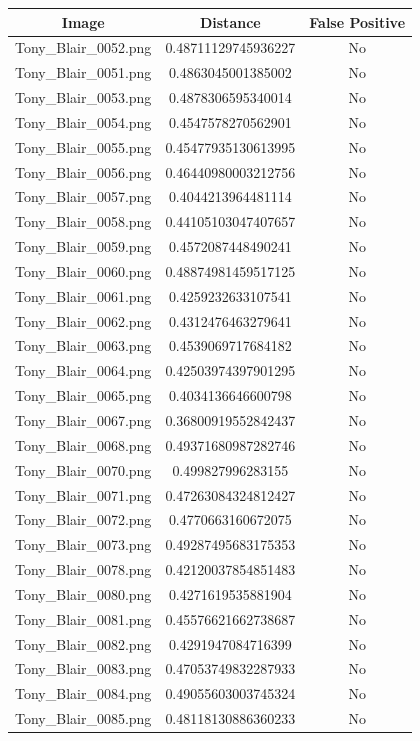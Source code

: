 \documentclass[12pt]{article}
\begin{document}
\begin{center}
\begin{tabular}{ccc}
Image & Distance & False Positive \\
\hline
Tony\_Blair\_0052.png & 0.48711129745936227 & No\\
Tony\_Blair\_0051.png & 0.4863045001385002 & No\\
Tony\_Blair\_0053.png & 0.4878306595340014 & No\\
Tony\_Blair\_0054.png & 0.4547578270562901 & No\\
Tony\_Blair\_0055.png & 0.45477935130613995 & No\\
Tony\_Blair\_0056.png & 0.46440980003212756 & No\\
Tony\_Blair\_0057.png & 0.4044213964481114 & No\\
Tony\_Blair\_0058.png & 0.44105103047407657 & No\\
Tony\_Blair\_0059.png & 0.4572087448490241 & No\\
Tony\_Blair\_0060.png & 0.48874981459517125 & No\\
Tony\_Blair\_0061.png & 0.4259232633107541 & No\\
Tony\_Blair\_0062.png & 0.4312476463279641 & No\\
Tony\_Blair\_0063.png & 0.4539069717684182 & No\\
Tony\_Blair\_0064.png & 0.42503974397901295 & No\\
Tony\_Blair\_0065.png & 0.4034136646600798 & No\\
Tony\_Blair\_0067.png & 0.36800919552842437 & No\\
Tony\_Blair\_0068.png & 0.49371680987282746 & No\\
Tony\_Blair\_0070.png & 0.499827996283155 & No\\
Tony\_Blair\_0071.png & 0.47263084324812427 & No\\
Tony\_Blair\_0072.png & 0.4770663160672075 & No\\
Tony\_Blair\_0073.png & 0.49287495683175353 & No\\
Tony\_Blair\_0078.png & 0.42120037854851483 & No\\
Tony\_Blair\_0080.png & 0.4271619535881904 & No\\
Tony\_Blair\_0081.png & 0.45576621662738687 & No\\
Tony\_Blair\_0082.png & 0.4291947084716399 & No\\
Tony\_Blair\_0083.png & 0.47053749832287933 & No\\
Tony\_Blair\_0084.png & 0.49055603003745324 & No\\
Tony\_Blair\_0085.png & 0.48118130886360233 & No\\

\end{tabular}
\end{center}
\end{document}
